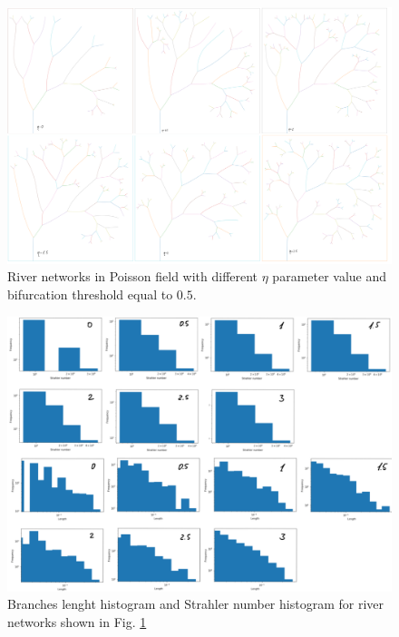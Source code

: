 \documentclass[]{pracamgr}
\begin{document}
        \begin{figure}[H]
          \centering
          \includegraphics[width=1\textwidth]{figs/sims/poisson_field_etas.png}        
          \caption{River networks in Poisson field with different $\eta$ parameter value and bifurcation threshold equal to $0.5$.}
          \label{poisson_etas}
        \end{figure}

        \begin{figure}[H]
          \centering
          \includegraphics[width=1\textwidth]{figs/sims/strahler_and_leght_histogram_for_poisson_field.png}        
          \caption{Branches lenght histogram and Strahler number histogram for river networks shown in Fig. \ref{poisson_etas}}
        \end{figure}
\end{document}
